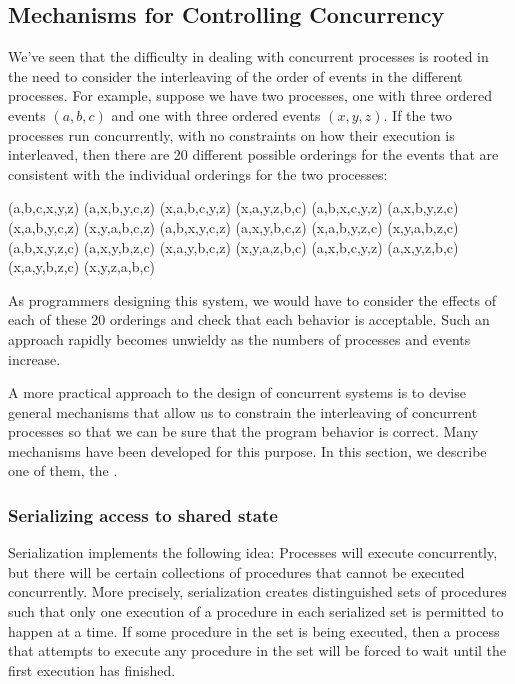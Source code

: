 \subsection{Mechanisms for Controlling Concurrency}
\label{Section 3.4.2}

We’ve seen that the difficulty in dealing with concurrent processes is rooted in the need to consider the interleaving of the order of events in the different processes.
For example, suppose we have two processes, one with three ordered events \( (a, b, c) \) and one with three ordered events \( (x, y, z) \).
If the two processes run concurrently, with no constraints on how their execution is interleaved, then there are 20 different possible orderings for the events that are consistent with the individual orderings for the two processes:
\begin{example}
	(a,b,c,x,y,z)  (a,x,b,y,c,z)  (x,a,b,c,y,z)  (x,a,y,z,b,c)
	(a,b,x,c,y,z)  (a,x,b,y,z,c)  (x,a,b,y,c,z)  (x,y,a,b,c,z)
	(a,b,x,y,c,z)  (a,x,y,b,c,z)  (x,a,b,y,z,c)  (x,y,a,b,z,c)
	(a,b,x,y,z,c)  (a,x,y,b,z,c)  (x,a,y,b,c,z)  (x,y,a,z,b,c)
	(a,x,b,c,y,z)  (a,x,y,z,b,c)  (x,a,y,b,z,c)  (x,y,z,a,b,c)
\end{example}
As programmers designing this system, we would have to consider the effects of each of these 20 orderings and check that each behavior is acceptable.
Such an approach rapidly becomes unwieldy as the numbers of processes and events increase.

A more practical approach to the design of concurrent systems is to devise general mechanisms that allow us to constrain the interleaving of concurrent processes so that we can be sure that the program behavior is correct.
Many mechanisms have been developed for this purpose.
In this section, we describe one of them, the .



\subsubsection*{Serializing access to shared state}

Serialization implements the following idea:
Processes will execute concurrently, but there will be certain collections of procedures that cannot be executed concurrently.
More precisely, serialization creates distinguished sets of procedures such that only one execution of a procedure in each serialized set is permitted to happen at a time.
If some procedure in the set is being executed, then a process that attempts to execute any procedure in the set will be forced to wait until the first execution has finished.

